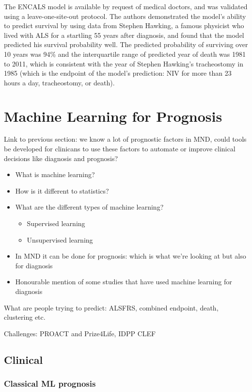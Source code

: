 The ENCALS model is available by request of medical doctors, and was validated using a leave-one-site-out protocol.
The authors demonstrated the model's ability to predict survival by using data from Stephen Hawking, a famous physicist who lived with ALS for a startling 55 years after diagnosis, and found that the model predicted his survival probability well.
The predicted probability of surviving over 10 years was 94\% and the interquartile range of predicted year of death was 1981 to 2011, which is consistent with the year of Stephen Hawking's tracheostomy in 1985 (which is the endpoint of the model's prediction: NIV for more than 23 hours a day, tracheostomy, or death).


\section{Machine Learning for Prognosis}


Link to previous section: we know a lot of prognostic factors in MND, could tools be developed for clinicans to use these factors to automate or improve clinical decisions like diagnosis and prognosis?


\begin{itemize}
    \item What is machine learning?
    \item How is it different to statistics?
    \item What are the different types of machine learning?
    \begin{itemize}
        \item Supervised learning
        \item Unsupervised learning
    \end{itemize}
    \item In MND it can be done for prognosis: which is what we're looking at but also for diagnosis
    \item Honourable mention of some studies that have used machine learning for diagnosis
\end{itemize}

What are people trying to predict: ALSFRS, combined endpoint, death, clustering etc.

Challenges: PROACT and Prize4Life, IDPP CLEF

\subsection{Clinical}

\subsubsection*{Classical ML prognosis}

